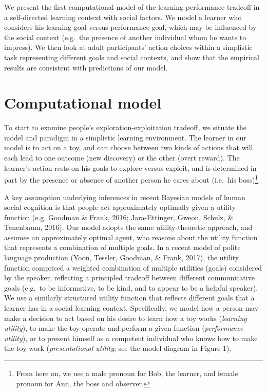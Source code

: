\documentclass[10pt, letterpaper]{article}
\begin{document}
We present the first computational model of the learning-performance
tradeoff in a self-directed learning context with social factors. We
model a learner who considers his learning goal versus performance goal,
which may be influenced by the social context (e.g.~the presence of
another individual whom he wants to impress). We then look at adult
participants' action choices within a simplistic task representing
different goals and social contexts, and show that the empirical results
are consistent with predictions of our model.

\section{Computational model}\label{computational-model}

To start to examine people's exploration-exploitation tradeoff, we
situate the model and paradigm in a simplistic learning environment. The
learner in our model is to act on a toy, and can choose between two
kinds of actions that will each lead to one outcome (new discovery) or
the other (overt reward). The learner's action rests on his goals to
explore versus exploit, and is determined in part by the presence or
absence of another person he cares about (i.e.~his
boss)\footnote{From here on, we use a male pronoun for Bob, the learner, and female pronoun for Ann, the boss and observer.}.

A key assumption underlying inferences in recent Bayesian models of
human social cognition is that people act approximately optimally given
a utility function (e.g. Goodman \& Frank, 2016; Jara-Ettinger, Gweon,
Schulz, \& Tenenbaum, 2016). Our model adopts the same utility-theoretic
approach, and assumes an approximately optimal agent, who reasons about
the utility function that represents a combination of multiple goals. In
a recent model of polite language production (Yoon, Tessler, Goodman, \&
Frank, 2017), the utility function comprised a weighted combination of
multiple utilities (goals) considered by the speaker, reflecting a
principled tradeoff between different communicative goals (e.g.~to be
informative, to be kind, and to appear to be a helpful speaker). We use
a similarly structured utility function that reflects different goals
that a learner has in a social learning context. Specifically, we model
how a person may make a decision to act based on his desire to learn how
a toy works (\emph{learning utility}), to make the toy operate and
perform a given function (\emph{performance utility}), or to present
himself as a competent individual who knows how to make the toy work
(\emph{presentational utility}; see the model diagram in Figure 1).
\end{document}
